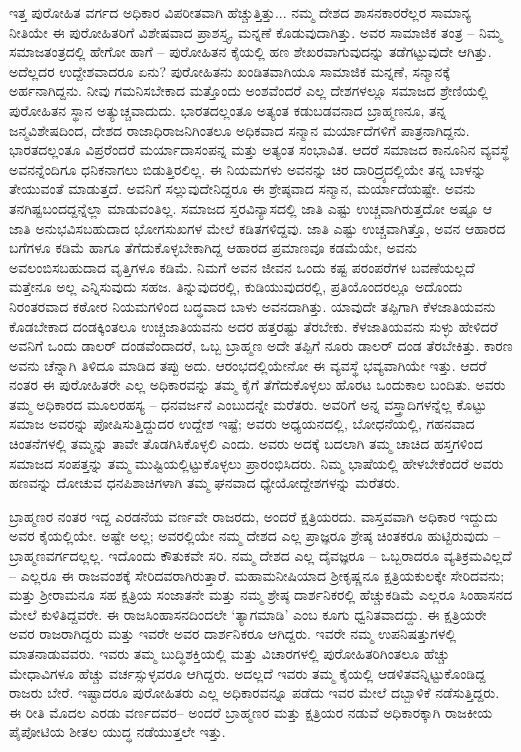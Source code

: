 ಇತ್ತ ಪುರೋಹಿತ ವರ್ಗದ ಅಧಿಕಾರ ವಿಪರೀತವಾಗಿ ಹೆಚ್ಚುತ್ತಿತ್ತು... ನಮ್ಮ ದೇಶದ ಶಾಸನಕಾರರೆಲ್ಲರ ಸಾಮಾನ್ಯ ನೀತಿಯೇ ಈ ಪುರೋಹಿತರಿಗೆ ವಿಶೇಷವಾದ ಪ್ರಾಶಸ್ತ್ಯ, ಮನ್ನಣೆ ಕೊಡುವುದಾಗಿತ್ತು. ಅವರ ಸಾಮಾಜಿಕ ತಂತ್ರ – ನಿಮ್ಮ ಸಮಾಜತಂತ್ರದಲ್ಲಿ ಹೇಗೋ ಹಾಗೆ – ಪುರೋಹಿತನ ಕೈಯಲ್ಲಿ ಹಣ ಶೇಖರವಾಗುವುದನ್ನು ತಡೆಗಟ್ಟುವುದೇ ಆಗಿತ್ತು. ಅದೆಲ್ಲದರ ಉದ್ದೇಶವಾದರೂ ಏನು? ಪುರೋಹಿತನು ಖಂಡಿತವಾಗಿಯೂ ಸಾಮಾಜಿಕ ಮನ್ನಣೆ, ಸನ್ಮಾನಕ್ಕೆ ಅರ್ಹನಾಗಿದ್ದನು. ನೀವು ಗಮನಿಸಬೇಕಾದ ಮತ್ತೊಂದು ಅಂಶವೆಂದರೆ ಎಲ್ಲ ದೇಶಗಳಲ್ಲೂ ಸಮಾಜದ ಶ್ರೇಣಿಯಲ್ಲಿ ಪುರೋಹಿತನ ಸ್ಥಾನ ಅತ್ಯುಚ್ಚವಾದುದು. ಭಾರತದಲ್ಲಂತೂ ಅತ್ಯಂತ ಕಡುಬಡವನಾದ ಬ್ರಾಹ್ಮಣನೂ, ತನ್ನ ಜನ್ಮವಿಶೇಷದಿಂದ, ದೇಶದ ರಾಜಾಧಿರಾಜನಿಗಿಂತಲೂ ಅಧಿಕವಾದ ಸನ್ಮಾನ ಮರ್ಯಾದೆಗಳಿಗೆ ಪಾತ್ರನಾಗಿದ್ದನು. ಭಾರತದಲ್ಲಂತೂ ವಿಪ್ರರೆಂದರೆ ಮರ್ಯಾದಾಸಂಪನ್ನ ಮತ್ತು ಅತ್ಯಂತ ಸಂಭಾವಿತ. ಆದರೆ ಸಮಾಜದ ಕಾನೂನಿನ ವ್ಯವಸ್ಥೆ ಅವನನ್ನೆಂದಿಗೂ ಧನಿಕನಾಗಲು ಬಿಡುತ್ತಿರಲಿಲ್ಲ. ಈ ನಿಯಮಗಳು ಅವನನ್ನು ಚಿರ ದಾರಿದ್ರ್ಯದಲ್ಲಿಯೇ ತನ್ನ ಬಾಳನ್ನು ತೇಯುವಂತೆ ಮಾಡುತ್ತದೆ. ಅವನಿಗೆ ಸಲ್ಲುವುದೇನಿದ್ದರೂ ಈ ಶ್ರೇಷ್ಠವಾದ ಸನ್ಮಾನ, ಮರ್ಯಾದೆಯಷ್ಟೇ. ಅವನು ತನಗಿಷ್ಟಬಂದದ್ದನ್ನೆಲ್ಲಾ ಮಾಡುವಂತಿಲ್ಲ. ಸಮಾಜದ ಸ್ತರವಿನ್ಯಾಸದಲ್ಲಿ ಜಾತಿ ಎಷ್ಟು ಉಚ್ಚವಾಗಿರುತ್ತದೋ ಅಷ್ಟೂ ಆ ಜಾತಿ ಅನುಭವಿಸಬಹುದಾದ ಭೋಗಸುಖಗಳ ಮೇಲೆ ಕಡಿತಗಳಿದ್ದವು. ಜಾತಿ ಎಷ್ಟು ಉಚ್ಚವಾಗಿತ್ತೊ, ಅವನ ಆಹಾರದ ಬಗೆಗಳೂ ಕಡಿಮೆ ಹಾಗೂ ತೆಗೆದುಕೊಳ್ಳಬೇಕಾಗಿದ್ದ ಆಹಾರದ ಪ್ರಮಾಣವೂ ಕಡಮೆಯೇ, ಅವನು ಅವಲಂಬಿಸಬಹುದಾದ ವೃತ್ತಿಗಳೂ ಕಡಿಮೆ. ನಿಮಗೆ ಅವನ ಜೀವನ ಒಂದು ಕಷ್ಟ ಪರಂಪರೆಗಳ ಬವಣೆಯಲ್ಲದೆ ಮತ್ತೇನೂ ಅಲ್ಲ ಎನ್ನಿಸುವುದು ಸಹಜ. ತಿನ್ನುವುದರಲ್ಲಿ, ಕುಡಿಯುವುದರಲ್ಲಿ, ಪ್ರತಿಯೊಂದರಲ್ಲೂ ಅದೊಂದು ನಿರಂತರವಾದ ಕಠೋರ ನಿಯಮಗಳಿಂದ ಬದ್ಧವಾದ ಬಾಳು ಅವನದಾಗಿತ್ತು. ಯಾವುದೇ ತಪ್ಪಿಗಾಗಿ ಕೆಳಜಾತಿಯವನು ಕೊಡಬೇಕಾದ ದಂಡಕ್ಕಿಂತಲೂ ಉಚ್ಚಜಾತಿಯವನು ಅದರ ಹತ್ತರಷ್ಟು ತೆರಬೇಕು. ಕೆಳಜಾತಿಯವನು ಸುಳ್ಳು ಹೇಳಿದರೆ ಅವನಿಗೆ ಒಂದು ಡಾಲರ್ ದಂಡವೆಂದಾದರೆ, ಒಬ್ಬ ಬ್ರಾಹ್ಮಣ ಅದೇ ತಪ್ಪಿಗೆ ನೂರು ಡಾಲರ್ ದಂಡ ತೆರಬೇಕಿತ್ತು. ಕಾರಣ ಅವನು ಚೆನ್ನಾಗಿ ತಿಳಿದೂ ಮಾಡಿದ ತಪ್ಪು ಅದು. ಆರಂಭದಲ್ಲಿಯೇನೋ ಈ ವ್ಯವಸ್ಥೆ ಭವ್ಯವಾಗಿಯೇ ಇತ್ತು. ಆದರೆ ನಂತರ ಈ ಪುರೋಹಿತರೇ ಎಲ್ಲ ಅಧಿಕಾರವನ್ನು ತಮ್ಮ ಕೈಗೆ ತೆಗೆದುಕೊಳ್ಳಲು ಹೊರಟ ಒಂದುಕಾಲ ಬಂದಿತು. ಅವರು ತಮ್ಮ ಅಧಿಕಾರದ ಮೂಲರಹಸ್ಯ – ಧನವರ್ಜನೆ ಎಂಬುದನ್ನೇ ಮರೆತರು. ಅವರಿಗೆ ಅನ್ನ ವಸ್ತ್ರಾದಿಗಳನ್ನೆಲ್ಲ ಕೊಟ್ಟು ಸಮಾಜ ಅವರನ್ನು ಪೋಷಿಸುತ್ತಿದ್ದುದರ ಉದ್ದೇಶ ಇಷ್ಟೆ; ಅವರು ಅಧ್ಯಯನದಲ್ಲಿ, ಬೋಧನೆಯಲ್ಲಿ, ಗಹನವಾದ ಚಿಂತನೆಗಳಲ್ಲಿ ತಮ್ಮನ್ನು ತಾವೇ ತೊಡಗಿಸಿಕೊಳ್ಳಲಿ ಎಂದು. ಅವರು ಅದಕ್ಕೆ ಬದಲಾಗಿ ತಮ್ಮ ಚಾಚಿದ ಹಸ್ತಗಳಿಂದ ಸಮಾಜದ ಸಂಪತ್ತನ್ನು ತಮ್ಮ ಮುಷ್ಟಿಯಲ್ಲಿಟ್ಟುಕೊಳ್ಳಲು ಪ್ರಾರಂಭಿಸಿದರು. ನಿಮ್ಮ ಭಾಷೆಯಲ್ಲಿ ಹೇಳಬೇಕೆಂದರೆ ಅವರು ಹಣವನ್ನು ದೋಚುವ ಧನಪಿಶಾಚಿಗಳಾಗಿ ತಮ್ಮ ಘನವಾದ ಧ್ಯೇಯೋದ್ದೇಶಗಳನ್ನು ಮರೆತರು.

ಬ್ರಾಹ್ಮಣರ ನಂತರ ಇದ್ದ ಎರಡನೆಯ ವರ್ಣವೇ ರಾಜರದು, ಅಂದರೆ ಕ್ಷತ್ರಿಯರದು. ವಾಸ್ತವವಾಗಿ ಅಧಿಕಾರ ಇದ್ದುದು ಅವರ ಕೈಯಲ್ಲಿಯೇ. ಅಷ್ಟೇ ಅಲ್ಲ; ಅವರಲ್ಲಿಯೇ ನಮ್ಮ ದೇಶದ ಎಲ್ಲ ಪ್ರಾಜ್ಞರೂ ಶ್ರೇಷ್ಠ ಚಿಂತಕರೂ ಹುಟ್ಟಿರುವುದು – ಬ್ರಾಹ್ಮಣವರ್ಗದಲ್ಲಲ್ಲ. ಇದೊಂದು ಕೌತುಕವೇ ಸರಿ. ನಮ್ಮ ದೇಶದ ಎಲ್ಲ ದೈವಜ್ಞರೂ – ಒಬ್ಬರಾದರೂ ವ್ಯತಿಕ್ರಮವಿಲ್ಲದೆ – ಎಲ್ಲರೂ ಈ ರಾಜವಂಶಕ್ಕೆ ಸೇರಿದವರಾಗಿರುತ್ತಾರೆ. ಮಹಾಮನೀಷಿಯಾದ ಶ‍್ರೀಕೃಷ್ಣನೂ ಕ್ಷತ್ರಿಯಕುಲಕ್ಕೇ ಸೇರಿದವನು; ಮತ್ತು ಶ‍್ರೀರಾಮನೂ ಸಹ ಕ್ಷತ್ರಿಯ ಸಂಜಾತನೇ ಮತ್ತು ನಮ್ಮ ಶ್ರೇಷ್ಠ ದಾರ್ಶನಿಕರಲ್ಲಿ ಹೆಚ್ಚುಕಡಿಮೆ ಎಲ್ಲರೂ ಸಿಂಹಾಸನದ ಮೇಲೆ ಕುಳಿತಿದ್ದವರೇ. ಈ ರಾಜಸಿಂಹಾಸನದಿಂದಲೇ ‘ತ್ಯಾಗಮಾಡಿ’ ಎಂಬ ಕೂಗು ಧ್ವನಿತವಾದದ್ದು. ಈ ಕ್ಷತ್ರಿಯರೇ ಅವರ ರಾಜರಾಗಿದ್ದರು ಮತ್ತು ಇವರೇ ಅವರ ದಾರ್ಶನಿಕರೂ ಆಗಿದ್ದರು. ಇವರೇ ನಮ್ಮ ಉಪನಿಷತ್ತುಗಳಲ್ಲಿ ಮಾತನಾಡುವವರು. ಇವರು ತಮ್ಮ ಬುದ್ಧಿಶಕ್ತಿಯಲ್ಲಿ ಮತ್ತು ವಿಚಾರಗಳಲ್ಲಿ ಪುರೋಹಿತರಿಗಿಂತಲೂ ಹೆಚ್ಚು ಮೇಧಾವಿಗಳೂ ಹೆಚ್ಚು ವರ್ಚಸ್ಸುಳ್ಳವರೂ ಆಗಿದ್ದರು. ಅದಲ್ಲದೆ ಇವರು ತಮ್ಮ ಕೈಯಲ್ಲಿ ಆಡಳಿತವನ್ನಿಟ್ಟುಕೊಂಡಿದ್ದ ರಾಜರು ಬೇರೆ. ಇಷ್ಟಾದರೂ ಪುರೋಹಿತರು ಎಲ್ಲ ಅಧಿಕಾರವನ್ನೂ ಪಡೆದು ಇವರ ಮೇಲೆ ದಬ್ಬಾಳಿಕೆ ನಡೆಸುತ್ತಿದ್ದರು. ಈ ರೀತಿ ಮೊದಲ ಎರಡು ವರ್ಣದವರ– ಅಂದರೆ ಬ್ರಾಹ್ಮಣರ ಮತ್ತು ಕ್ಷತ್ರಿಯರ ನಡುವೆ ಅಧಿಕಾರಕ್ಕಾಗಿ ರಾಜಕೀಯ ಪೈಪೋಟಿಯ ಶೀತಲ ಯುದ್ಧ ನಡೆಯುತ್ತಲೇ ಇತ್ತು.

